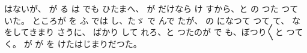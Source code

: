 はないが、
が
る
は
でも
ひたまへ、
が
だけなら
け
すから、と
の
つた
つて
いた。
ところが
を
ふ
では
し、たゞ
で
んで
たが、
の
になつて
つて
て、
な
をしてきまり
さうに、
ばかり
して
れろ、と
つたのが
で
も、ぼつり〳〵と
つて
く。
が
が
を
けたはじまりだつた。
